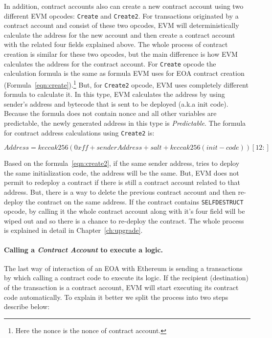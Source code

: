 In addition, contract accounts also can create a new contract account using two different EVM opcodes: \texttt{Create} and \texttt{Create2}. For transactions originated by a contract account and consist of these two opcodes, EVM will deterministically calculate the address for the new account and then create a contract account with the related four fields explained above. The whole process of contract creation is similar for these two opcodes, but the main difference is how EVM calculates the address for the contract account. For \texttt{Create} opcode the calculation formula is the same as formula EVM uses for EOA contract creation (Formula~\ref{eqn:create}).\footnote{Here the nonce is the nonce of contract account.} But, for \texttt{Create2} opcode, EVM uses completely different formula to calculate it. In this type, EVM calculates the address by using sender's address and bytecode that is sent to be deployed (a.k.a init code). Because the formula does not contain nonce and all other variables are predictable, the newly generated address in this type is \emph{Predictable}. The formula for contract address calculations using \texttt{Create2} is:

\begin{equation}
    \label{eqn:create2}
    Address = keccak256(0xff + senderAddress + salt + keccak256(init-code))[12:]    
\end{equation}

Based on the formula~\ref{eqn:create2}, if the same sender address, tries to deploy the same initialization code, the address will be the same. But, EVM does not permit to redeploy a contract if there is still a contract account related to that address. But, there is a way to delete the previous contract account and then re-deploy the contract on the same address. If the contract contains \texttt{SELFDESTRUCT} opcode, by calling it the whole contract account along with it's four field will be wiped out and so there is a chance to re-deploy the contract. The whole process is explained in detail in Chapter~\ref{ch:upgrade}. 

\paragraph{Calling a \textit{Contract Account} to execute a logic.}
The last way of interaction of an EOA with Ethereum is sending a transactions by which calling a contract code to execute its logic. If the recipient (destination) of the transaction is a contract account, EVM will start executing its contract code automatically. To explain it better we split the process into two steps describe below:

